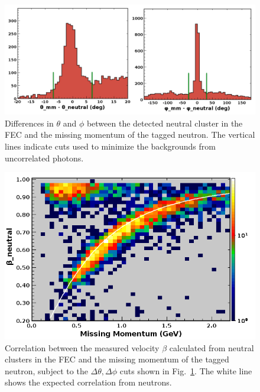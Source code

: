 \begin{figure}[h]
\centering
\includegraphics[width=1.0\columnwidth,keepaspectratio]{img/S10_4_1.png}
\caption[]{Differences in $\theta$ and $\phi$ between the detected neutral cluster in the FEC and the missing momentum of the tagged neutron.  The vertical lines indicate cuts used to minimize the backgrounds from uncorrelated photons.}
\label{fig:S10_4_1}
\end{figure}

\begin{figure}[h]
\centering
\includegraphics[width=1.0\columnwidth,keepaspectratio]{img/S10_4_2.png}
\caption[]{Correlation between the measured velocity $\beta$ calculated from neutral clusters in the FEC and the missing momentum of the tagged neutron, subject to the $\Delta\theta,\Delta\phi$ cuts shown in Fig.~\ref{fig:S10_4_1}.  The white line shows the expected correlation from neutrons.}
\label{fig:S10_4_2}
\end{figure}

